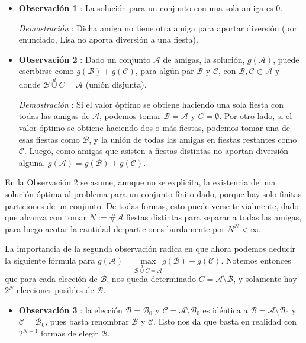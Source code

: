 \begin{itemize}
	\item \textbf{Observación 1} : La solución para un conjunto con una sola amiga es $0$. 

	\textit{Demostración} : Dicha amiga no tiene otra amiga para aportar diversión (por enunciado, Lisa no aporta diversión a una fiesta).
	\item \textbf{Observación 2} : Dado un conjunto $\mathcal{A}$ de amigas,   la solución, $g(\mathcal{A})$, puede escribirse como $g(\mathcal{B}) + g(\mathcal{C})$, para algún par $\mathcal{B}$ y $\mathcal{C}$, con $\mathcal{B},\mathcal{C} \subset \mathcal{A}$ y donde $\mathcal{B} \overset{d}{\cup} C = \mathcal{A}$ (unión disjunta).
	
	\textit{Demostración} : Si el valor óptimo se obtiene haciendo una sola fiesta con todas las amigas de $\mathcal{A}$, podemos tomar $\mathcal{B} = \mathcal{A}$ y $C = \emptyset$. Por otro lado, si el valor óptimo se obtiene haciendo dos o más fiestas, podemos tomar una de esas fiestas como $\mathcal{B}$, y la unión de todas las amigas en fiestas restantes como $\mathcal{C}$. Luego, como amigas que asisten a fiestas distintas no aportan diversión alguna, $g(\mathcal{A}) = g(\mathcal{B}) + g(\mathcal{C})$.
\end{itemize}

En la Observación 2 se asume, aunque no se explicita, la existencia de una solución óptima al problema para un conjunto finito dado, porque hay solo finitas particiones de un conjunto. De todas formas, esto puede verse trivialmente, dado que alcanza con tomar $N := \# \mathcal{A}$ fiestas distintas para separar a todas las amigas, para luego acotar la cantidad de particiones burdamente por $N^N < \infty $.

La importancia de la segunda observación radica en que ahora podemos deducir la siguiente fórmula para $\boxed{g(\mathcal{A}) = \underset{\mathcal{B} \overset{d}{\cup} C = \mathcal{A}}{\text{max}} g(\mathcal{B}) + g(\mathcal{C})}$. Notemos entonces que para cada elección de $\mathcal{B}$, nos queda determinado $C = \mathcal{A} \setminus \mathcal{B}$, y solamente hay $2^N$ elecciones posibles de $\mathcal{B}$.

\begin{itemize}
	\item \textbf{Observación 3} : la elección $\mathcal{B} = \mathcal{B}_0$ y $\mathcal{C} = \mathcal{A} \setminus \mathcal{B}_0$ es idéntica a $\mathcal{B} = \mathcal{A} \setminus \mathcal{B}_0$ y $\mathcal{C} = \mathcal{B}_0$, pues basta renombrar $\mathcal{B}$ y $\mathcal{C}$. Esto nos da que basta en realidad con $2^{N-1}$ formas de elegir $\mathcal{B}$.
\end{itemize}


